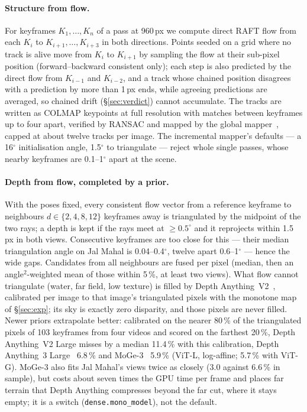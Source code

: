 \documentclass[10pt,a4paper,twocolumn]{article}
\begin{document}
\paragraph{Structure from flow.} For keyframes $K_1,\dots,K_n$ of a pass at 960\,px we compute direct RAFT flow from each $K_i$ to $K_{i+1},\dots,K_{i+3}$ in both directions. Points seeded on a grid where no track is alive move from $K_i$ to $K_{i+1}$ by sampling the flow at their sub-pixel position (forward--backward consistent only); each step is also predicted by the direct flow from $K_{i-1}$ and $K_{i-2}$, and a track whose chained position disagrees with a prediction by more than 1\,px ends, while agreeing predictions are averaged, so chained drift (\S\ref{sec:verdict}) cannot accumulate. The tracks are written as COLMAP keypoints at full resolution with matches between keyframes up to four apart, verified by RANSAC and mapped by the global mapper~\cite{pan2024glomap}, capped at about twelve tracks per image. The incremental mapper's defaults --- a 16$^\circ$ initialisation angle, 1.5$^\circ$ to triangulate --- reject whole single passes, whose nearby keyframes are 0.1--1$^\circ$ apart at the scene.

\paragraph{Depth from flow, completed by a prior.} With the poses fixed, every consistent flow vector from a reference keyframe to neighbours $d\in\{2,4,8,12\}$ keyframes away is triangulated by the midpoint of the two rays; a depth is kept if the rays meet at $\ge 0.5^\circ$ and it reprojects within 1.5\,px in both views. Consecutive keyframes are too close for this --- their median triangulation angle on Jal Mahal is 0.04--0.4$^\circ$, twelve apart 0.6--1$^\circ$ --- hence the wide gaps. Candidates from all neighbours are fused per pixel (median, then an angle$^2$-weighted mean of those within 5\,\%, at least two views). What flow cannot triangulate (water, far field, low texture) is filled by Depth Anything~V2~\cite{yang2024dav2}, calibrated per image to that image's triangulated pixels with the monotone map of \S\ref{sec:exp}; its sky is exactly zero disparity, and those pixels are never filled. Newer priors extrapolate better: calibrated on the nearer 80\,\% of the triangulated pixels of 103 keyframes from four videos and scored on the farthest 20\,\%, Depth Anything~V2 Large misses by a median 11.4\,\% with this calibration, Depth Anything~3 Large~\cite{lin2025da3} 6.8\,\% and MoGe-3~\cite{wang2025moge2,kong2026moge3} 5.9\,\% (ViT-L, log-affine; 5.7\,\% with ViT-G). MoGe-3 also fits Jal Mahal's views twice as closely (3.0 against 6.6\,\% in sample), but costs about seven times the GPU time per frame and places far terrain that Depth Anything compresses beyond the far cut, where it stays empty; it is a switch (\texttt{dense.mono\_model}), not the default.
\end{document}
